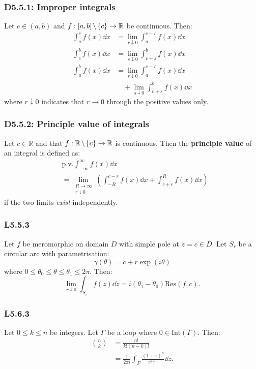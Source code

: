 \documentclass{article}
\begin{document}
\begin{multicols*}{3}
\subsubsection*{D5.5.1: Improper integrals}
Let $c\in(a,b)$ and $f:[a,b]\hspace{0.02in}\backslash\hspace{0.02in}
\{c\}\rightarrow\mathbb{R}$ be continuous. Then:
\begin{align*}
    \int_{a}^{c}f(x)\dd x &=\lim_{r\downarrow0}
    \int_{a}^{c-r}f(x)\dd x \\
    \int_{c}^{b}f(x)\dd x &=\lim_{s\downarrow0}
    \int_{c+s}^{b}f(x)\dd x \\
    \int_{a}^{b}f(x)\dd x &=\lim_{r\downarrow0}
    \int_{a}^{c-r}f(x)\dd x \\ &\quad+\lim_{s\downarrow0}
    \int_{c+s}^{b}f(x)\dd x
\end{align*}
where $r\downarrow0$ indicates that $r\rightarrow0$
through the positive values only.

\subsubsection*{D5.5.2: Principle value of integrals}
Let $c\in\mathbb{R}$ and that $f:\mathbb{R}\hspace{0.02in}\backslash
\hspace{0.02in}\{c\}\rightarrow\mathbb{R}$ is continuous. Then the
\textbf{principle value} of an integral is defined as:
\begin{align*}
    &\text{p.v.}\int_{-\infty}^{\infty}f(x)\dd x \\
    &=\lim_{\substack{R\rightarrow\infty \\ r\downarrow0}}
    \left(\int_{-R}^{c-r}f(x)\dd x
    +\int_{c+r}^{R}f(x)\dd x\right)
\end{align*}
if the two limits \textit{exist} independently.

\subsubsection*{L5.5.3}
Let $f$ be meromorphic on domain $D$ with simple pole
at $z=c\in D$.
Let $S_r$ be a circular arc with parametrisation:
$$\gamma(\theta)=c+r\exp(i\theta)$$
where $0\leq\theta_0\leq\theta\leq\theta_1\leq2\pi$.
Then:
$$\lim_{r\downarrow0}\int_{S_r}f(z)\dd z
=i(\theta_1-\theta_0)\text{Res}(f,c).$$

\subsubsection*{L5.6.3}
Let $0\leq k\leq n$ be integers. Let $\Gamma$ be a loop
where $0\in\text{Int}(\Gamma)$. Then:
\begin{align*}
    \binom{n}{k}
    &=\frac{n!}{k!(n-k)!} \\
    &=\frac{1}{2\pi i}\int_{\Gamma}
    \frac{(1+z)^n}{z^{k+1}}\dd z.
\end{align*}

\end{multicols*}
\end{document}
